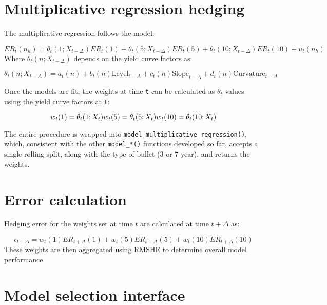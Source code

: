 \documentclass[openany]{book}
\theoremstyle{definition}
\theoremstyle{definition}
\theoremstyle{definition}
\theoremstyle{remark}
\begin{document}
\hypertarget{multiplicative-regression-hedging}{%
\section{Multiplicative regression
hedging}\label{multiplicative-regression-hedging}}

The multiplicative regression follows the model:

\[ ER_t(n_h) = \theta_t(1; X_{t-\Delta}) ER_t(1) + \theta_t(5; X_{t-\Delta}) ER_t(5) + \theta_t(10; X_{t-\Delta}) ER_t(10) + u_t(n_h) \]
Where \(\theta_t(n; X_{t-\Delta})\) depends on the yield curve factors
as:

\[ \theta_t(n; X_{t-\Delta}) = a_t(n) + b_t(n) \text{Level}_{t-\Delta} + c_t(n) \text{Slope}_{t-\Delta} + d_t(n) \text{Curvature}_{t-\Delta} \]

Once the models are fit, the weights at time \texttt{t} can be
calculated as \(\theta_t\) values using the yield curve factors at
\texttt{t}:

\[ w_t(1) = \theta_t(1; X_t) \\ w_t(5) = \theta_t(5; X_t) \\ w_t(10) = \theta_t(10; X_t) \]

The entire procedure is wrapped into
\texttt{model\_multiplicative\_regression()}, which, consistent with the
other \texttt{model\_*()} functions developed so far, accepts a single
rolling split, along with the type of bullet (3 or 7 year), and returns
the weights.

\small

\normalsize

\hypertarget{error-calculation}{%
\section{Error calculation}\label{error-calculation}}

Hedging error for the weights set at time \(t\) are calculated at time
\(t+\Delta\) as:

\[ \epsilon_{t+\Delta} = w_t(1) ER_{t+\Delta}(1) + w_t(5) ER_{t+\Delta}(5) + w_t(10) ER_{t+\Delta}(10) \]
These weights are then aggregated using RMSHE to determine overall model
performance.

\small

\normalsize

\hypertarget{model-selection-interface}{%
\section{Model selection interface}\label{model-selection-interface}}
\end{document}
